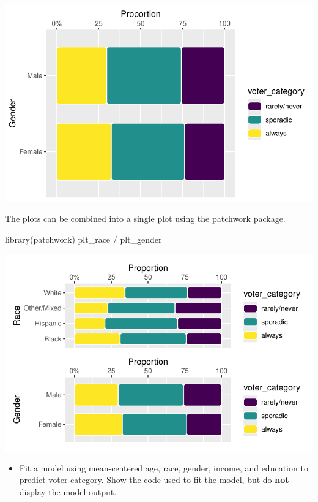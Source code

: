 \documentclass[
  letterpaper,
  DIV=11,
  numbers=noendperiod]{scrartcl}
\newenvironment{Shaded}{\begin{snugshade}}{\end{snugshade}}
\newcommand{\FunctionTok}[1]{\textcolor[rgb]{0.28,0.35,0.67}{#1}}
\newcommand{\NormalTok}[1]{\textcolor[rgb]{0.00,0.23,0.31}{#1}}
\newcommand{\SpecialCharTok}[1]{\textcolor[rgb]{0.37,0.37,0.37}{#1}}
\providecommand{\tightlist}{%
  \setlength{\itemsep}{0pt}\setlength{\parskip}{0pt}}\usepackage{longtable,booktabs,array}
\begin{document}
\includegraphics{Lab4_multinom_Questions-1_files/figure-pdf/unnamed-chunk-7-1.pdf}

The plots can be combined into a single plot using the patchwork
package.

\begin{Shaded}
\begin{Highlighting}[]
\FunctionTok{library}\NormalTok{(patchwork)}
\NormalTok{plt\_race }\SpecialCharTok{/}\NormalTok{ plt\_gender}
\end{Highlighting}
\end{Shaded}

\includegraphics{Lab4_multinom_Questions-1_files/figure-pdf/unnamed-chunk-8-1.pdf}

\begin{itemize}
\tightlist
\item
  Fit a model using mean-centered age, race, gender, income, and
  education to predict voter category. Show the code used to fit the
  model, but do \textbf{not} display the model output.
\end{itemize}
\end{document}
